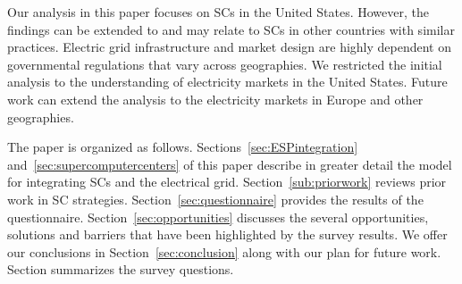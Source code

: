 Our analysis in this paper focuses %
on SCs in the United States. However, 
the findings can be extended to and may relate to SCs in other countries with similar practices. 
Electric grid infrastructure and market design are highly dependent on %
governmental regulations that vary across geographies. We restricted the initial analysis to the understanding of 
electricity markets in the United States. Future work can extend the analysis to the electricity markets in Europe and other geographies.

The paper is organized as follows.
Sections~\ref{sec:ESPintegration} and~\ref{sec:supercomputercenters} of this paper
describe in greater detail the model for 
integrating SCs and the electrical grid.
Section~\ref{sub:priorwork}
reviews prior work in SC strategies. %
Section~\ref{sec:questionnaire} provides the results of the questionnaire. 
Section~\ref{sec:opportunities} 
discusses the several opportunities, solutions and barriers that have been highlighted
by the survey results. We offer our conclusions in Section~\ref{sec:conclusion} along with our plan for future work. %
Section  summarizes the survey questions.
